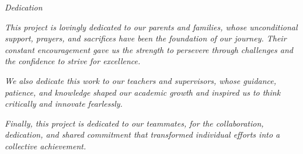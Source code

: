 \newpage
\thispagestyle{plain}%
\begin{center}
\vspace*{\fill}
\textit{\Large Dedication}
\vspace{1cm}

\textit{
This project is lovingly dedicated to our parents and families,  
whose unconditional support, prayers, and sacrifices have been the foundation of our journey.  
Their constant encouragement gave us the strength to persevere through challenges  
and the confidence to strive for excellence.
}

\vspace{1cm}

\textit{
We also dedicate this work to our teachers and supervisors,  
whose guidance, patience, and knowledge shaped our academic growth  
and inspired us to think critically and innovate fearlessly.
}

\vspace{1cm}

\textit{
Finally, this project is dedicated to our teammates,  
for the collaboration, dedication, and shared commitment  
that transformed individual efforts into a collective achievement.
}

\vspace*{\fill}
\end{center}

\vfill
\newpage

